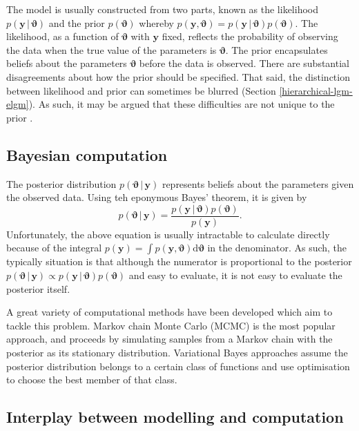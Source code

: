 \documentclass[a4paper, nobind]{templates/ociamthesis}
\newcommand{\y}{\mathbf{y}}
\newcommand{\bvartheta}{\bm{\vartheta}}
\begin{document}
The model is usually constructed from two parts, known as the likelihood \(p(\y \, | \, \bvartheta)\) and the prior \(p(\bvartheta)\) whereby \(p(\y, \bvartheta) = p(\y \, | \, \bvartheta) p(\bvartheta)\).
The likelihood, as a function of \(\bvartheta\) with \(\y\) fixed, reflects the probability of observing the data when the true value of the parameters is \(\bvartheta\).
The prior encapsulates beliefs about the parameters \(\bvartheta\) before the data is observed.
There are substantial disagreements about how the prior should be specified.
That said, the distinction between likelihood and prior can sometimes be blurred (Section \ref{hierarchical-lgm-elgm}).
As such, it may be argued that these difficulties are not unique to the prior \autocite{gelman2017prior}.

\hypertarget{bayesian-computation}{%
\subsection{Bayesian computation}\label{bayesian-computation}}

The posterior distribution \(p(\bvartheta \, | \, \y)\) represents beliefs about the parameters given the observed data.
Using teh eponymous Bayes' theorem, it is given by
\begin{equation}
p(\bvartheta \, | \, \y) = \frac{p(\y \, | \, \bvartheta) p(\bvartheta)}{p(\y)}. \label{eq:posterior}
\end{equation}
Unfortunately, the above equation is usually intractable to calculate directly because of the integral \(p(\y) = \int p(\y, \bvartheta) \text{d}\bvartheta\) in the denominator.
As such, the typically situation is that although the numerator is proportional to the posterior \(p(\bvartheta \, | \, \y) \propto p(\y \, | \, \bvartheta) p(\bvartheta)\) and easy to evaluate, it is not easy to evaluate the posterior itself.

A great variety of computational methods have been developed which aim to tackle this problem.
Markov chain Monte Carlo (MCMC) is the most popular approach, and proceeds by simulating samples from a Markov chain with the posterior as its stationary distribution.
Variational Bayes approaches assume the posterior distribution belongs to a certain class of functions and use optimisation to choose the best member of that class.

\hypertarget{interplay-between-modelling-and-computation}{%
\subsection{Interplay between modelling and computation}\label{interplay-between-modelling-and-computation}}
\end{document}
